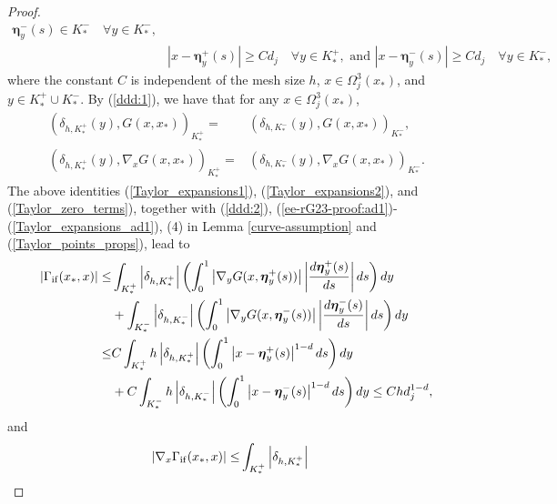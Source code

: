 \documentclass[1996/10/24]{amsart}
\theoremstyle{definition}
\numberwithin{equation}{section}
\begin{document}
\begin{proof}
\begin{subequations}
\begin{align}
\boldsymbol{\eta}_{y}^{-}(s) \in K_{\ast}^{-} \quad \forall y\in K_{\ast}^{-}, \\
\label{Taylor_points_prop2}
& \left| x - \boldsymbol{\eta}_{y}^{+}(s) \right| \geq Cd_{j} \quad \forall y\in K_{\ast}^{+}, \text{ and }
\left| x - \boldsymbol{\eta}_{y}^{-}(s) \right| \geq Cd_{j} \quad \forall y\in K_{\ast}^{-},
\end{align}
\end{subequations}
where the constant $C$ is independent of the mesh size $h$, $x\in \Omega_{j}^{3}(x_{\ast})$, and
$y \in K_{\ast}^{+}\cup K_{\ast}^{-}$.
By (\ref{ddd:1}), we have that for any $x\in \Omega_{j}^{3}(x_{\ast})$,
\begin{subequations}
\label{Taylor_zero_terms}
\begin{align}
(\delta_{h,K_{\ast}^{+}}(y), G(x,x_{\ast}))_{K_{\ast}^{+}}
= & (\delta_{h,K_{\ast}^{-}}(y), G(x,x_{\ast}))_{K_{\ast}^{-}}, \\
(\delta_{h,K_{\ast}^{+}}(y), \nabla_x G(x,x_{\ast}))_{K_{\ast}^{+}}
= & (\delta_{h,K_{\ast}^{-}}(y), \nabla_x G(x,x_{\ast}))_{K_{\ast}^{-}}.
\end{align}
\end{subequations}
The above identities (\ref{Taylor_expansions1}), (\ref{Taylor_expansions2}), and (\ref{Taylor_zero_terms}), together
with (\ref{ddd:2}), (\ref{ee-rG23-proof:ad1})-(\ref{Taylor_expansions_ad1}), (4) in Lemma \ref{curve-assumption} and
(\ref{Taylor_points_props}), lead to
\begin{align*}
\left|\Gamma_{{\rm if}}(x_{\ast},x)\right|\leq&\int_{K_{\ast}^+}\left|\delta_{h,K_{\ast}^+}\right|
\left(\int_{0}^{1} \left|\nabla_y G(x,\boldsymbol{\eta}_{y}^{+}(s))\right|
\left|\frac{d \boldsymbol{\eta}_{y}^{+}(s)}{ds}\right|ds\right) dy\\
&+\int_{K_{\ast}^-}\left|\delta_{h,K_{\ast}^-}\right|
\left(\int_{0}^{1} \left|\nabla_y G(x,\boldsymbol{\eta}_{y}^{-}(s))\right|
\left|\frac{d \boldsymbol{\eta}_{y}^{-}(s)}{ds}\right|ds\right) dy\\
\leq& C\int_{K_{\ast}^+}h\left|\delta_{h,K_{\ast}^+}\right|
\left(\int_{0}^{1}\left| x - \boldsymbol{\eta}_{y}^{+}(s) \right|^{1-d} ds \right) dy\\
&+C\int_{K_{\ast}^-}h\left|\delta_{h,K_{\ast}^-}\right|
\left(\int_{0}^{1}\left| x - \boldsymbol{\eta}_{y}^{-}(s) \right|^{1-d} ds \right)dy\leq Chd_j^{1-d},
\end{align*}
and
\begin{align*}
\left| \nabla_{x} \Gamma_{{\rm if}}(x_{\ast},x)\right|\leq&\int_{K_{\ast}^+}\left|\delta_{h,K_{\ast}^+}\right|

\end{align*}
\end{proof}
\end{document}
